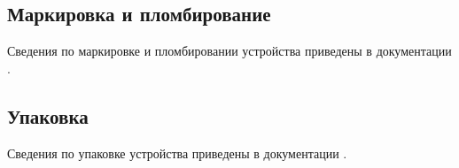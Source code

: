 \color{unidarkgreen}\subsection{Маркировка и пломбирование}\color{black}
Сведения по маркировке и пломбировании устройства приведены в документации \ManualUnitGeneral.

\color{unidarkgreen}\subsection{Упаковка}\color{black}
Сведения по упаковке устройства приведены в документации \ManualUnitGeneral.
